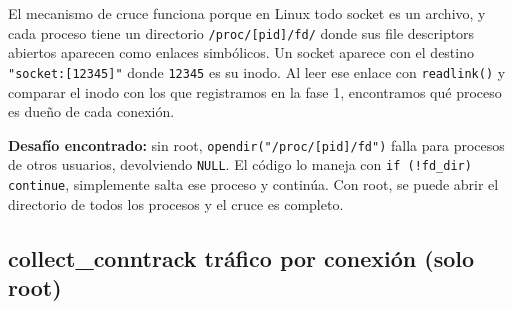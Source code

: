 \documentclass[12pt,letterpaper]{article}
\begin{document}
El mecanismo de cruce funciona porque en Linux todo socket es un archivo, y cada proceso tiene un directorio
\texttt{/proc/[pid]/fd/} donde sus file descriptors abiertos aparecen como enlaces simbólicos. Un socket
aparece con el destino \texttt{"socket:[12345]"} donde \texttt{12345} es su inodo. Al leer ese enlace con
\texttt{readlink()} y comparar el inodo con los que registramos en la fase 1, encontramos qué proceso es dueño
de cada conexión.

\medskip

\textbf{Desafío encontrado:} sin root, \texttt{opendir("/proc/[pid]/fd")} falla para procesos de otros usuarios,
devolviendo \texttt{NULL}. El código lo maneja con \texttt{if (!fd\_dir) continue}, simplemente salta ese
proceso y continúa. Con root, se puede abrir el directorio de todos los procesos y el cruce es completo.

\subsection*{collect\_conntrack tráfico por conexión (solo root)}
\end{document}
